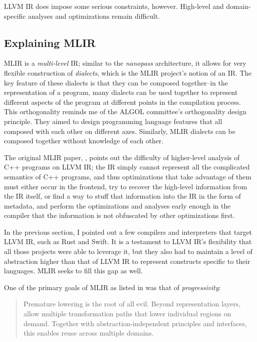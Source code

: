 LLVM IR does impose some serious constraints, however.
High-level and domain-specific analyses and optimizations remain difficult.

\subsection{Explaining MLIR}

MLIR\cite{lattner_amini_mlir_og_paper_2021} is a \textit{multi-level} IR;
similar to the \textit{nanopass} architecture\cite{keep_dybvig_nanopass_2013},
it allows for very flexible construction of \textit{dialects}, which is the MLIR
project's notion of an IR. The key feature of these dialects is that they can be
composed together--in the representation of a program, many dialects can be used
together to represent different aspects of the program at different points in
the compilation process.
This orthogonality reminds me of the ALGOL committee's orthogonality design principle.
They aimed to design programming language features that all composed with each other
on different axes.
Similarly, MLIR dialects can be composed together without knowledge of each other.

The original MLIR paper, ,
points out the difficulty of higher-level analysis of C++ programs on LLVM IR;
the IR simply cannot represent all the complicated semantics of C++ programs,
and thus optimizations that take advantage of them must either occur in the
frontend, try to recover the high-level information from the IR itself,
or find a way to stuff that information into the IR in the form of metadata,
and perform the optimizations and analyses early enough in the compiler that
the information is not obfuscated by other optimizations first.

In the previous section, I pointed out a few compilers and interpreters that
target LLVM IR, such as Rust and Swift.
It is a testament to LLVM IR's flexibility that all those projects were able to
leverage it, but they also had to maintain a level of abstraction higher than that
of LLVM IR to represent constructs specific to their languages.
MLIR seeks to fill this gap as well.

One of the primary goals of MLIR as listed in 
was that of \textit{progressivity}:
\begin{quotation}
	Premature lowering is the root of all evil.
	Beyond representation layers, allow multiple transformation
	paths that lower individual regions on demand. Together with
	abstraction-independent principles and interfaces, this enables
	reuse across multiple domains.
\end{quotation}

